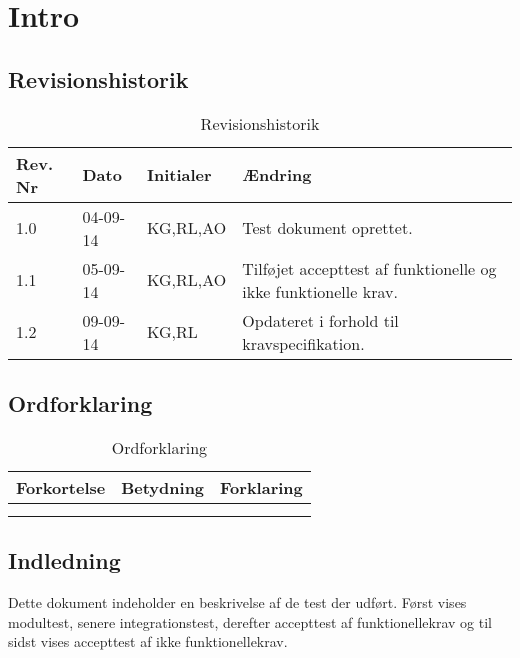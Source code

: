 \chapter{Intro}

\section{Revisionshistorik}

\begin{table}[H]
	\centering
		\begin{tabular}{|p{2 cm}|p{2 cm}|p{3 cm}|p{6 cm}|} 
		\hline
			\textbf{Rev. Nr} & \textbf{Dato}		& \textbf{Initialer} 	& \textbf{Ændring} \\ \hline
			1.0 	& 04-09-14	& KG,RL,AO		& Test dokument oprettet.	\\ \hline
			1.1 	& 05-09-14	& KG,RL,AO		& Tilføjet accepttest af funktionelle og ikke funktionelle krav.\\ \hline
			1.2 	& 09-09-14	& KG,RL			& Opdateret i forhold til kravspecifikation.	\\ \hline
		\end{tabular}
	\caption{Revisionshistorik}
\end{table}

\section{Ordforklaring}


\begin{table}[H]
	\centering
		\begin{tabular}{|p{2.5cm}|p{4.5 cm}|p{6.5 cm}|}  
		\hline
			\textbf{Forkortelse} & \textbf{Betydning} & \textbf{Forklaring} \\ \hline
			& & \\ \hline
			& & \\ \hline
		\end{tabular}
	\caption{Ordforklaring}
\end{table}

\vspace{5cm}

\section{Indledning}

Dette dokument indeholder en beskrivelse af de test der udført. Først vises modultest, senere integrationstest, derefter accepttest af funktionellekrav og til sidst vises accepttest af ikke funktionellekrav.